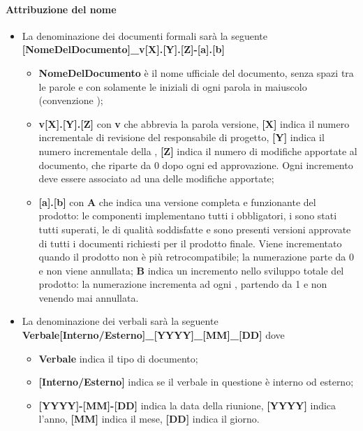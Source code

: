 {\paragraph*{Attribuzione del nome}
\begin{itemize}
	\item La denominazione dei documenti formali sarà la seguente \newline
	\textbf{[NomeDelDocumento]\_v[X].[Y].[Z]-[a].[b]}
	\begin{itemize}
		\item \textbf{NomeDelDocumento} è il nome ufficiale del documento, senza spazi tra le parole e con solamente le iniziali di ogni parola in maiuscolo (convenzione );
		\item \textbf{v[X].[Y].[Z]} con \textbf{v} che abbrevia la parola versione, \textbf{[X]} indica il numero incrementale di revisione del responsabile di progetto, \textbf{[Y]} indica il numero incrementale della , \textbf{[Z]} indica il numero di modifiche apportate al documento, che riparte da 0 dopo ogni  ed approvazione. Ogni incremento deve essere associato ad una  delle modifiche apportate;
		\item \textbf{[a].[b]} con \textbf{A} che indica una versione completa e funzionante del prodotto: le componenti 
implementano tutti i  obbligatori, i  sono stati tutti superati, le  di qualità soddisfatte e sono presenti versioni approvate di tutti i documenti richiesti per il prodotto finale. Viene incrementato quando il prodotto  non è più retrocompatibile; la numerazione parte da 0 e non viene annullata; \textbf{B} indica un incremento nello sviluppo totale del prodotto: la numerazione incrementa ad ogni , partendo da 1 e non venendo mai annullata.
	\end{itemize}
	\item La denominazione dei verbali sarà la seguente\newline
	\textbf{Verbale[Interno/Esterno]\_[YYYY]\_[MM]\_[DD]}\newline
	dove
	\begin{itemize}
		\item \textbf{Verbale} indica il tipo di documento;
		\item \textbf{[Interno/Esterno]} indica se il verbale in questione è interno od esterno;
		\item \textbf{[YYYY]-[MM]-[DD]} indica la data della riunione, \textbf{[YYYY]} indica l'anno, \textbf{[MM]} indica il mese, \textbf{[DD]} indica il giorno.
	\end{itemize}
\end{itemize}
}
